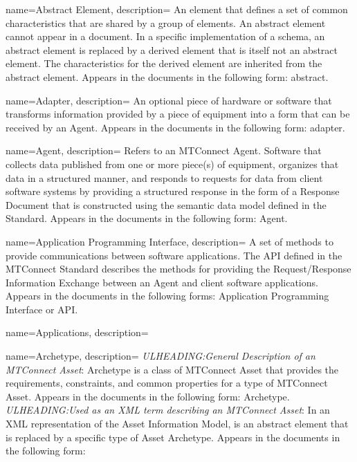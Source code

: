 
{
    name={Abstract Element},
	description={
  An element that defines a set of common characteristics that are shared by a group of elements.
  An abstract element cannot appear in a document. In a specific implementation of a schema, an abstract element is replaced by a derived element that is itself not an abstract element. The characteristics for the derived element are inherited from the abstract element. 
  Appears in the documents in the following form: abstract.
}
}

{
    name={Adapter},
	description={
  An optional piece of hardware or software that transforms information provided by a piece of equipment into a form that can be received by an \gls{Agent}.
  Appears in the documents in the following form: adapter.
}
}

{
    name={Agent},
	description={
  Refers to an MTConnect Agent. 
  Software that collects data published from one or more piece(s) of equipment, organizes that data in a structured manner, and responds to requests for data from client software systems by providing a structured response in the form of a \gls{Response Document} that is constructed using the \gls{semantic data model} defined in the Standard. 
  Appears in the documents in the following form: \gls{Agent}.
}
}

{
    name={Application Programming Interface},
	description={
  A set of methods to provide communications between software applications.
  The API defined in the MTConnect Standard describes the methods for providing the \gls{Request/Response} Information Exchange between an \gls{Agent} and client software applications.
  Appears in the documents in the following forms: Application Programming Interface or API.
}
}

{
    name={Applications},
	description={}
}

{
    name={Archetype},
	description={
  \textit{ULHEADING:General Description of an \gls{MTConnect Asset}}:
  Archetype is a class of \gls{MTConnect Asset} that provides the requirements, constraints, and common properties for a type of \gls{MTConnect Asset}.
  Appears in the documents in the following form: Archetype.
  \textit{ULHEADING:Used as an XML term describing an \gls{MTConnect Asset}}:
  In an XML representation of the \gls{Asset Information Model},  is an abstract element that is replaced by a specific type of \gls{Asset} Archetype.
  Appears in the documents in the following form: 
}
}

